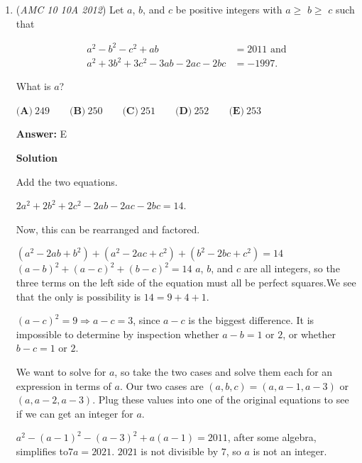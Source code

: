 \begin{enumerate}
 \textbf{Remark} This is similar to a certain 2023 Mathcounts Chapter Problem.....

 Uh just a comment, what problem on the 2023 Mathcounts Chapter is similar to this? I can't find any problem. -Mathman645

 The $n=2$ case is equivalent to Sprint problem $30.$ There is no flavortext, but the problem is the same.

 


	\item (\textit{AMC 10 10A 2012}) Let $a$, $b$, and $c$ be positive integers with $a\ge$ $b\ge$ $c$ such that

 \begin{align*}a^2-b^2-c^2+ab&=2011\text{ and}\\ a^2+3b^2+3c^2-3ab-2ac-2bc&=-1997.\end{align*}



 What is $a$?


 $\textbf{(A)}\ 249\qquad\textbf{(B)}\ 250\qquad\textbf{(C)}\ 251\qquad\textbf{(D)}\ 252\qquad\textbf{(E)}\ 253$

 \textbf{Answer: }E



\textbf{Solution}

Add the two equations.

 $2a^2 + 2b^2 + 2c^2 - 2ab - 2ac - 2bc = 14$.

 Now, this can be rearranged and factored.

 $(a^2 - 2ab + b^2) + (a^2 - 2ac + c^2) + (b^2 - 2bc + c^2) = 14$
$(a - b)^2 + (a - c)^2 + (b - c)^2 = 14$
$a$, $b$, and $c$ are all integers, so the three terms on the left side of the equation must all be perfect squares.We see that the only is possibility is $14 = 9 + 4 + 1$. 

 $(a-c)^2 = 9 \Rightarrow a-c = 3$, since $a-c$ is the biggest difference. It is impossible to determine by inspection whether $a-b = 1$ or $2$, or whether $b-c = 1$ or $2$.

 We want to solve for $a$, so take the two cases and solve them each for an expression in terms of $a$. Our two cases are $(a, b, c) = (a, a-1, a-3)$ or $(a, a-2, a-3)$. Plug these values into one of the original equations to see if we can get an integer for $a$.

 $a^2 - (a-1)^2 - (a-3)^2 + a(a-1) = 2011$, after some algebra, simplifies to$7a = 2021$. $2021$ is not divisible by $7$, so $a$ is not an integer. 


\end{enumerate}
